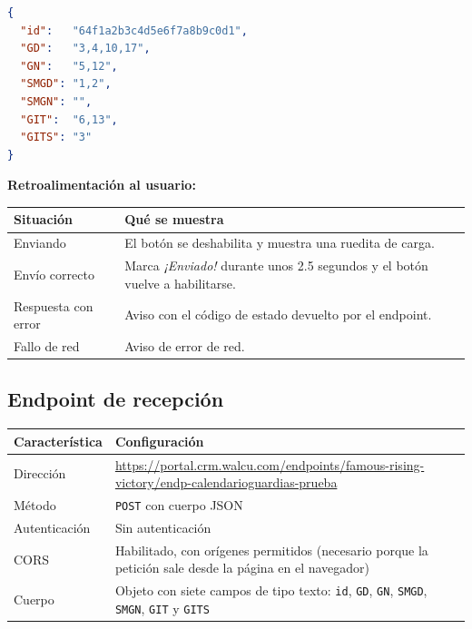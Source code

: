 \documentclass[11pt,a4paper]{article}
\newcommand{\code}[1]{\texttt{#1}}
\begin{document}
\begin{lstlisting}[style=codigo,language=json]
{
  "id":   "64f1a2b3c4d5e6f7a8b9c0d1",
  "GD":   "3,4,10,17",
  "GN":   "5,12",
  "SMGD": "1,2",
  "SMGN": "",
  "GIT":  "6,13",
  "GITS": "3"
}
\end{lstlisting}

\textbf{Retroalimentación al usuario:}
\begin{longtable}{@{}p{4.4cm}p{10.4cm}@{}}
\toprule
\textbf{Situación} & \textbf{Qué se muestra} \\
\midrule
\endhead
Enviando & El botón se deshabilita y muestra una ruedita de carga. \\
Envío correcto & Marca \emph{¡Enviado!} durante unos 2.5 segundos y el botón vuelve a habilitarse. \\
Respuesta con error & Aviso con el código de estado devuelto por el endpoint. \\
Fallo de red & Aviso de error de red. \\
\bottomrule
\end{longtable}

\subsection{Endpoint de recepción}
\begin{longtable}{@{}p{4.2cm}p{10.6cm}@{}}
\toprule
\textbf{Característica} & \textbf{Configuración} \\
\midrule
\endhead
Dirección & {\small\url{https://portal.crm.walcu.com/endpoints/famous-rising-victory/endp-calendarioguardias-prueba}} \\
Método & \code{POST} con cuerpo JSON \\
Autenticación & Sin autenticación \\
CORS & Habilitado, con orígenes permitidos \* (necesario porque la petición sale desde la página en el navegador) \\
Cuerpo & Objeto con siete campos de tipo texto: \code{id}, \code{GD}, \code{GN}, \code{SMGD}, \code{SMGN}, \code{GIT} y \code{GITS} \\
\bottomrule
\end{longtable}
\end{document}
